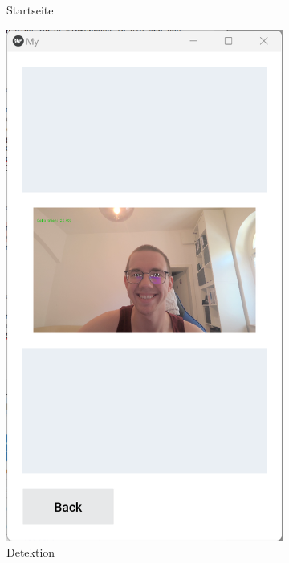 \begin{figure}[h]
\begin{subfigure}[b]{0.22\textwidth}
		\caption{Startseite}
		\label{fig:mainscreen}
	\end{subfigure}
	\hfill
	\begin{subfigure}[b]{0.22\textwidth}
		\includegraphics[width=\linewidth]{images/detectionscreen.png}
		\caption{Detektion}
		\label{fig:detectionscreen}
	\end{subfigure}
	\hfill
	\begin{subfigure}[b]{0.22\textwidth}

\end{subfigure}
\end{figure}
